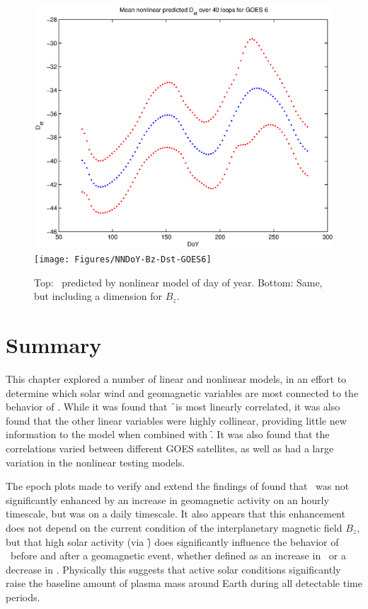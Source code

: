 \begin{figure}[htp!]
	\centering
	\includegraphics[width=0.7\linewidth]{Figures/NNDoY-Dst-GOES6}	
	\texttt{[image: Figures/NNDoY-Bz-Dst-GOES6]}
	\caption{Top: \dst\ predicted by nonlinear model of day of year. Bottom: Same, but including a dimension for $B_z$.}
	\label{fig:DoYDst}
\end{figure}

\section{Summary}
This chapter explored a number of linear and nonlinear models, in an effort to determine which solar wind and geomagnetic variables are most connected to the behavior of \req. While it was found that \f\ is most linearly correlated, it was also found that the other linear variables were highly collinear, providing little new information to the model when combined with \f.  It was also found that the correlations varied between different GOES satellites, as well as had a large variation in the nonlinear testing models. 

The epoch plots made to verify and extend the findings of \cite{Takahashi2010SolarCycleVariation} found that \req\ was not significantly enhanced by an increase in geomagnetic activity on an hourly timescale, but was on a daily timescale. It also appears that this enhancement does not depend on the current condition of the interplanetary magnetic field $B_z$, but that high solar activity (via \f) does significantly influence the behavior of \req\ before and after a geomagnetic event, whether defined as an increase in \req\ or a decrease in \dst. Physically this suggests that active solar conditions significantly raise the baseline amount of plasma mass around Earth during all detectable time periods.


